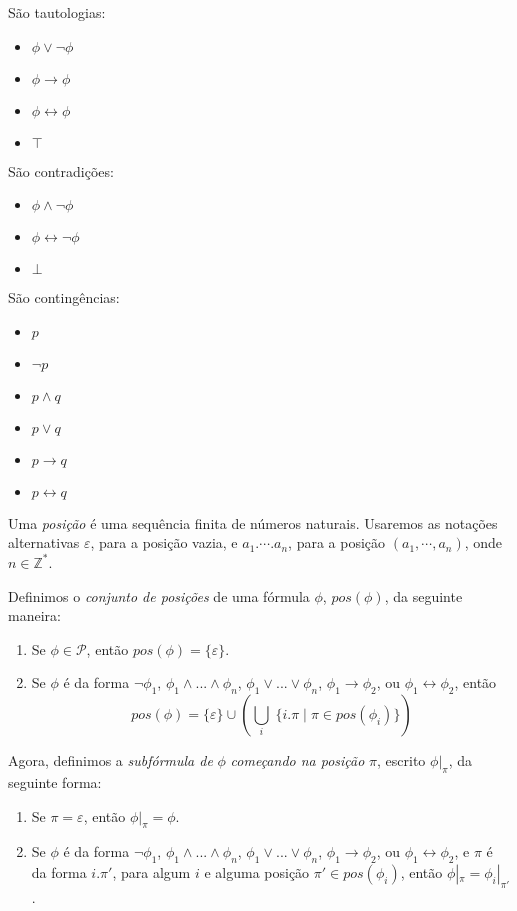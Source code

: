 \begin{example}
    São tautologias:
    \begin{itemize}
        \item $\phi \vee \neg \phi$
        \item $\phi \rightarrow \phi$
        \item $\phi \leftrightarrow \phi$
        \item $\top$
    \end{itemize}
    São contradições:
    \begin{itemize}
        \item $\phi \wedge \neg \phi$
        \item $\phi \leftrightarrow \neg \phi$
        \item $\bot$
    \end{itemize}
    São contingências:
    \begin{itemize}
    	\item $p$
    	\item $\neg p$
    	\item $p \wedge q$
    	\item $p \vee q$
    	\item $p \rightarrow q$
    	\item $p \leftrightarrow q$
    \end{itemize}
\end{example}

\begin{definition}
	Uma \emph{posição} é uma sequência finita de números naturais. Usaremos as notações alternativas $\varepsilon$, para a posição vazia, e $a_1.\cdots.a_n$, para a posição $(a_1,\cdots,a_n)$, onde $n \in \mathbb{Z}^*$.
	
    Definimos o \emph{conjunto de posições} de uma fórmula $\phi$, $pos(\phi)$, da seguinte maneira:
    \begin{enumerate}
        \item Se $\phi \in \mathcal{P}$, então $pos(\phi) = \{\varepsilon\}$.
        \item Se $\phi$ é da forma $\neg \phi_1$, $\phi_1 \wedge ... \wedge \phi_n$, $\phi_1 \vee ... \vee \phi_n$, $\phi_1 \rightarrow \phi_2$, ou $\phi_1 \leftrightarrow \phi_2$, então $$pos(\phi) = \{\varepsilon\} \cup \left(\bigcup_i \; \{i.\pi \mid \pi \in pos(\phi_i)\}\right)$$
    \end{enumerate}
    Agora, definimos a \emph{subfórmula de} $\phi$ \emph{começando na posição} $\pi$, escrito $\phi|_\pi$, da seguinte forma:
    \begin{enumerate}
        \item Se $\pi = \varepsilon$, então $\phi|_\pi = \phi$.
        \item Se $\phi$ é da forma $\neg \phi_1$, $\phi_1 \wedge ... \wedge \phi_n$, $\phi_1 \vee ... \vee \phi_n$, $\phi_1 \rightarrow \phi_2$, ou $\phi_1 \leftrightarrow \phi_2$, e $\pi$ é da forma $i.\pi'$, para algum $i$ e alguma posição $\pi' \in pos(\phi_i)$, então $\phi|_\pi = \phi_i|_{\pi'}$.
    \end{enumerate}
\end{definition}


